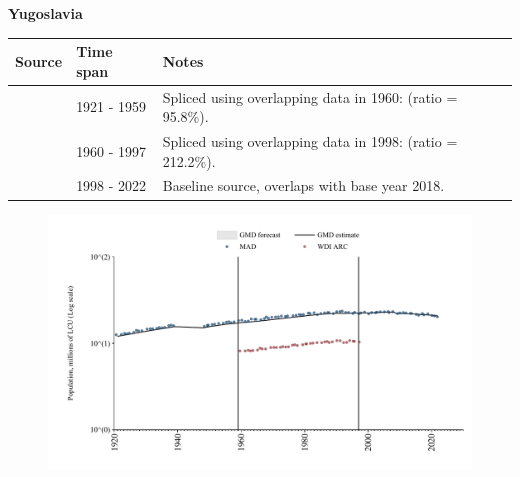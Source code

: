 \documentclass[12pt,a4paper,landscape]{article}
\begin{document}
\begin{adjustbox}{max totalsize={\paperwidth}{\paperheight},center}
\begin{minipage}[t][\textheight][t]{\textwidth}
\vspace*{0.5cm}
{}
\begin{center}
{\Large\bfseries Yugoslavia}
\end{center}
\vspace{0.5cm}
\begin{table}[H]
\centering
\small
\begin{tabular}{|l|l|l|}
\hline
\textbf{Source} & \textbf{Time span} & \textbf{Notes} \\
\hline
\rowcolor{white}\cite{MAD}& 1921 - 1959 &Spliced using overlapping data in 1960: (ratio = 95.8\%).\\
\rowcolor{lightgray}\cite{WDI_ARC}& 1960 - 1997 &Spliced using overlapping data in 1998: (ratio = 212.2\%).\\
\rowcolor{white}\cite{MAD}& 1998 - 2022 &Baseline source, overlaps with base year 2018.\\
\hline
\end{tabular}
\end{table}
\begin{figure}[H]
\centering
\includegraphics[width=\textwidth,height=0.6\textheight,keepaspectratio]{graphs/YUG_pop.pdf}
\end{figure}
\end{minipage}
\end{adjustbox}
\end{document}
